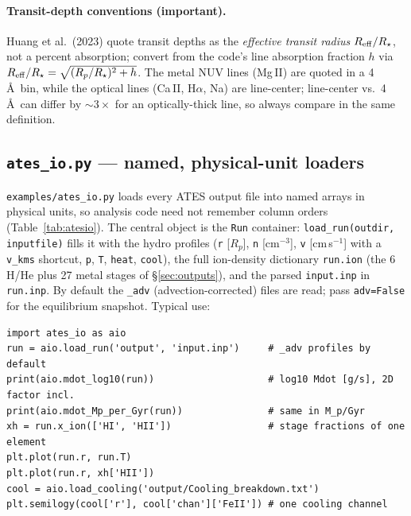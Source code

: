 \documentclass[english,a4paper]{kiseon_memo}
\begin{document}
\paragraph{Transit-depth conventions (important).} Huang et al.\ (2023) quote
transit depths as the \emph{effective transit radius} $R_{\rm eff}/R_\star$, not a
percent absorption; convert from the code's line absorption fraction $h$ via
$R_{\rm eff}/R_\star=\sqrt{(R_p/R_\star)^2+h}$. The metal NUV lines (Mg\,II) are
quoted in a 4\,\AA\ bin, while the optical lines (Ca\,II, H$\alpha$, Na) are
line-center; line-center vs.\ 4\,\AA\ can differ by $\sim3\times$ for an
optically-thick line, so always compare in the same definition.

\subsection{\texttt{ates\_io.py} --- named, physical-unit loaders}
\label{sec:atesio}
\texttt{examples/ates\_io.py} loads every ATES output file into named arrays
in physical units, so analysis code need not remember column orders
(Table~\ref{tab:atesio}). The central object is the \texttt{Run} container:
\texttt{load\_run(outdir, inputfile)} fills it with the hydro profiles
(\texttt{r} [$R_p$], \texttt{n} [cm$^{-3}$], \texttt{v} [cm\,s$^{-1}$] with a
\texttt{v\_kms} shortcut, \texttt{p}, \texttt{T}, \texttt{heat},
\texttt{cool}), the full ion-density dictionary \texttt{run.ion} (the 6 H/He
plus 27 metal stages of \S\ref{sec:outputs}), and the parsed
\texttt{input.inp} in \texttt{run.inp}. By default the \texttt{\_adv}
(advection-corrected) files are read; pass \texttt{adv=False} for the
equilibrium snapshot. Typical use:
\begin{lstlisting}[style=sh]
import ates_io as aio
run = aio.load_run('output', 'input.inp')     # _adv profiles by default
print(aio.mdot_log10(run))                    # log10 Mdot [g/s], 2D factor incl.
print(aio.mdot_Mp_per_Gyr(run))               # same in M_p/Gyr
xh = run.x_ion(['HI', 'HII'])                 # stage fractions of one element
plt.plot(run.r, run.T)
plt.plot(run.r, xh['HII'])
cool = aio.load_cooling('output/Cooling_breakdown.txt')
plt.semilogy(cool['r'], cool['chan']['FeII']) # one cooling channel
\end{lstlisting}
\end{document}
